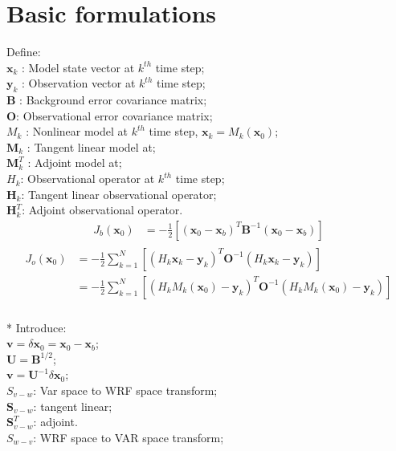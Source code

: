 \documentclass[a4paper,12pt,titlepage]{article}
\begin{document}
\section{Basic formulations}

Define:\\
$\mathbf{x}_k$ : Model state vector at $k^{th}$ time step;\\
$\mathbf{y}_k$ : Observation vector at $k^{th}$ time step;\\
$\mathbf{B}$ : Background error covariance matrix;\\
$\mathbf{O}$: Observational error covariance matrix;\\
$M_k$ : Nonlinear model at $k^{th}$ time step, $\mathbf{x}_k=M_k(\mathbf{x}_0)$;\\
$\mathbf{M}_k$ : Tangent linear model at;\\
$\mathbf{M}^T_k$ : Adjoint model at;\\
$H_k$: Observational operator at $k^{th}$ time step;\\
$\mathbf{H}_k$: Tangent linear observational operator;\\
$\mathbf{H}^T_k$: Adjoint observational operator.\\
\begin{align}
J_b(\mathbf{x}_0) &=-\frac{1}{2}[(\mathbf{x}_0-\mathbf{x}_b)^T\mathbf{B}^{-1}(\mathbf{x}_0-\mathbf{x}_b)]
\end{align}
\begin{align}
\begin{split}
J_o(\mathbf{x}_0) &=-\frac{1}{2}\sum_{k=1}^N[(H_k\mathbf{x}_k-\mathbf{y}_k)^T\mathbf{O}^{-1}(H_k\mathbf{x}_k-\mathbf{y}_k)]  \\
& =-\frac{1}{2}\sum_{k=1}^N[(H_kM_k(\mathbf{x}_0)-\mathbf{y}_k)^T\mathbf{O}^{-1}(H_kM_k(\mathbf{x}_0)-\mathbf{y}_k)]
\end{split}
\end{align}
\\*
Introduce: \\
$\mathbf{v}=\delta\mathbf{x}_0=\mathbf{x}_0-\mathbf{x}_b$;\\
$\mathbf{U}=\mathbf{B}^{1/2}$;\\
$\mathbf{v}=\mathbf{U}^{-1}\delta\mathbf{x}_0$;\\
$S_{v-w}$: Var space to WRF space transform; \\
$\mathbf{S}_{v-w}$: tangent linear; \\
$\mathbf{S}^T_{v-w}$: adjoint.\\
$S_{w-v}$: WRF space to VAR space transform; \\
\end{document}
